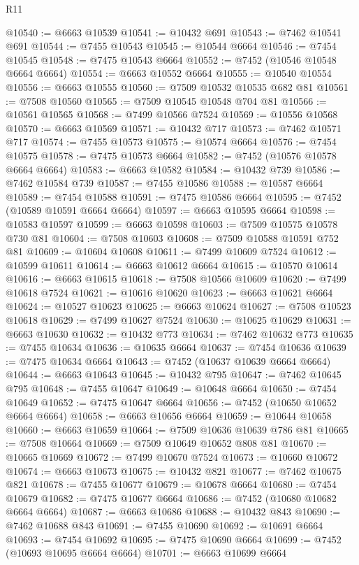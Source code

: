 \begin{lexlean}{R11}
\begin{coremodule}
{{{{{{{{{{{{{{{{{{{{{{{{{{{{{{{{{{{{{{{{{{{{{{{{{{{{{{{{{{{{{{{{{{{{{{{{{{{{{{{{{{@10540 := @6663 @10539
@10541 := @10432 @691
@10543 := @7462 @10541 @691
@10544 := @7455 @10543
@10545 := @10544 @6664
@10546 := @7454 @10545
@10548 := @7475 @10543 @6664
@10552 := @7452 (@10546 @10548 @6664 @6664)
@10554 := @6663 @10552 @6664
@10555 := @10540 @10554
@10556 := @6663 @10555
@10560 := @7509 @10532 @10535 @682 @81
@10561 := @7508 @10560
@10565 := @7509 @10545 @10548 @704 @81
@10566 := @10561 @10565
@10568 := @7499 @10566 @7524
@10569 := @10556 @10568
@10570 := @6663 @10569
@10571 := @10432 @717
@10573 := @7462 @10571 @717
@10574 := @7455 @10573
@10575 := @10574 @6664
@10576 := @7454 @10575
@10578 := @7475 @10573 @6664
@10582 := @7452 (@10576 @10578 @6664 @6664)
@10583 := @6663 @10582
@10584 := @10432 @739
@10586 := @7462 @10584 @739
@10587 := @7455 @10586
@10588 := @10587 @6664
@10589 := @7454 @10588
@10591 := @7475 @10586 @6664
@10595 := @7452 (@10589 @10591 @6664 @6664)
@10597 := @6663 @10595 @6664
@10598 := @10583 @10597
@10599 := @6663 @10598
@10603 := @7509 @10575 @10578 @730 @81
@10604 := @7508 @10603
@10608 := @7509 @10588 @10591 @752 @81
@10609 := @10604 @10608
@10611 := @7499 @10609 @7524
@10612 := @10599 @10611
@10614 := @6663 @10612 @6664
@10615 := @10570 @10614
@10616 := @6663 @10615
@10618 := @7508 @10566 @10609
@10620 := @7499 @10618 @7524
@10621 := @10616 @10620
@10623 := @6663 @10621 @6664
@10624 := @10527 @10623
@10625 := @6663 @10624
@10627 := @7508 @10523 @10618
@10629 := @7499 @10627 @7524
@10630 := @10625 @10629
@10631 := @6663 @10630
@10632 := @10432 @773
@10634 := @7462 @10632 @773
@10635 := @7455 @10634
@10636 := @10635 @6664
@10637 := @7454 @10636
@10639 := @7475 @10634 @6664
@10643 := @7452 (@10637 @10639 @6664 @6664)
@10644 := @6663 @10643
@10645 := @10432 @795
@10647 := @7462 @10645 @795
@10648 := @7455 @10647
@10649 := @10648 @6664
@10650 := @7454 @10649
@10652 := @7475 @10647 @6664
@10656 := @7452 (@10650 @10652 @6664 @6664)
@10658 := @6663 @10656 @6664
@10659 := @10644 @10658
@10660 := @6663 @10659
@10664 := @7509 @10636 @10639 @786 @81
@10665 := @7508 @10664
@10669 := @7509 @10649 @10652 @808 @81
@10670 := @10665 @10669
@10672 := @7499 @10670 @7524
@10673 := @10660 @10672
@10674 := @6663 @10673
@10675 := @10432 @821
@10677 := @7462 @10675 @821
@10678 := @7455 @10677
@10679 := @10678 @6664
@10680 := @7454 @10679
@10682 := @7475 @10677 @6664
@10686 := @7452 (@10680 @10682 @6664 @6664)
@10687 := @6663 @10686
@10688 := @10432 @843
@10690 := @7462 @10688 @843
@10691 := @7455 @10690
@10692 := @10691 @6664
@10693 := @7454 @10692
@10695 := @7475 @10690 @6664
@10699 := @7452 (@10693 @10695 @6664 @6664)
@10701 := @6663 @10699 @6664
}}}}}}}}}}}}}}}}}}}}}}}}}}}}}}}}}}}}}}}}}}}}}}}}}}}}}}}}}}}}}}}}}}}}}}}}}}}}}}}}}}
\end{coremodule}
\end{lexlean}
